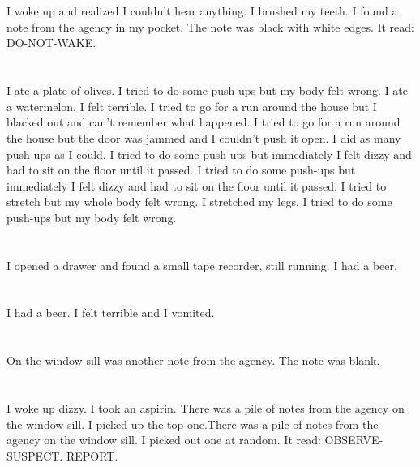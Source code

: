 \documentclass{article}
\begin{document}
    \section{}
    I woke up and realized I couldn't hear anything. I brushed my teeth. I found a note from the agency in my pocket. The note was black with white edges. It read: DO-NOT-WAKE.  
    \newpage
    
    \section{}
    I ate a plate of olives. I tried to do some push-ups but my body felt wrong. I ate a watermelon. I felt terrible.  I tried to go for a run around the house but I blacked out and can't remember what happened.  I tried to go for a run around the house but the door was jammed and I couldn't push it open.  I did as many push-ups as I could.  I tried to do some push-ups but immediately I felt dizzy and had to sit on the floor until it passed.   I tried to do some push-ups but immediately I felt dizzy and had to sit on the floor until it passed.  I tried to stretch but my whole body felt wrong.  I stretched my legs.  I tried to do some push-ups but my body felt wrong.  
    \newpage
    
    \section{}
    I opened a drawer and found a small tape recorder, still running. I had a beer.  
    \newpage
    
    \section{}
    I had a beer. I felt terrible and I vomited.  
    \newpage
    
    \section{}
    On the window sill was another note from the agency. The note was blank.  
    \newpage
    
    \section{}
    I woke up dizzy. I took an aspirin. There was a pile of notes from the agency on the window sill. I picked up the top one.There was a pile of notes from the agency on the window sill. I picked out one at random. It read: OBSERVE-SUSPECT. REPORT.  
    \newpage
    
\end{document}
